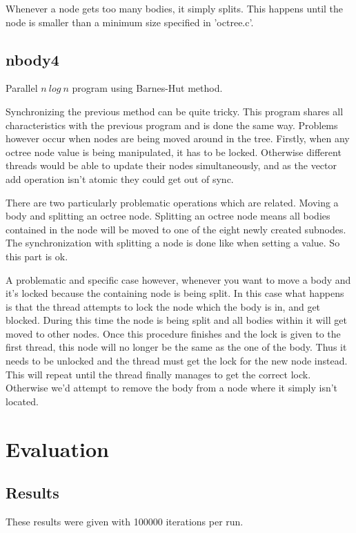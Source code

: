 \documentclass[a4paper] {article}
\begin{document}
Whenever a node gets too many bodies, it simply splits. This happens until the node is smaller than a minimum size specified in 'octree.c'.

\subsection{nbody4}

Parallel $n\ log\ n$ program using Barnes-Hut method.

Synchronizing the previous method can be quite tricky. This program shares all characteristics with the previous program and is done the same way. Problems however occur when nodes are being moved around in the tree. Firstly, when any octree node value is being manipulated, it has to be locked. Otherwise different threads would be able to update their nodes simultaneously, and as the vector add operation isn't atomic they could get out of sync.

There are two particularly problematic operations which are related. Moving a body and splitting an octree node. Splitting an octree node means all bodies contained in the node will be moved to one of the eight newly created subnodes. The synchronization with splitting a node is done like when setting a value. So this part is ok.

A problematic and specific case however, whenever you want to move a body and it's locked because the containing node is being split. In this case what happens is that the thread attempts to lock the node which the body is in, and get blocked. During this time the node is being split and all bodies within it will get moved to other nodes. Once this procedure finishes and the lock is given to the first thread, this node will no longer be the same as the one of the body. Thus it needs to be unlocked and the thread must get the lock for the new node instead. This will repeat until the thread finally manages to get the correct lock. Otherwise we'd attempt to remove the body from a node where it simply isn't located.

\section{Evaluation}

\subsection{Results}

These results were given with 100000 iterations per run.\\
\end{document}

